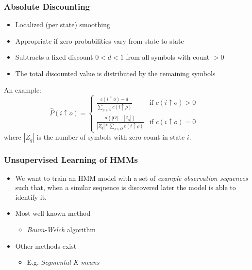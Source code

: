 \documentclass{beamer}
\begin{document}
\begin{frame} \frametitle{Absolute Discounting}
  
  \begin{itemize}
  \item Localized (per state) smoothing
  \item Appropriate if zero probabilities vary from state to state
  \item Subtracts a fixed discount $0 < d < 1$ from all symbols with count $>0$
  \item The total discounted value is distributed by the remaining symbols
  \end{itemize}

  An example:
  \begin{displaymath}
    \hat{P}(i \uparrow o) = 
    \left\{
    \begin{array}{ll}
      \frac{c(i \uparrow o)-d}
           {\sum_{\rho \in O}c(i \uparrow \rho)} &
                 \text{if $c(i \uparrow o) > 0$ }\\[2ex]
      \frac{d(|O|-|Z_q|)}{|Z_q|*\sum_{\rho \in O}c(i \uparrow \rho)} &
         \text{if $c(i \uparrow o) = 0$ }
    \end{array}
    \right.
  \end{displaymath}
  where $|Z_q|$ is the number of symbols with zero count in state $i$.

\end{frame}



\begin{frame} \frametitle{Unsupervised Learning of HMMs}

  \begin{itemize}
  \item We want to train an HMM model with a set of \emph{example observation
        sequences} such that, when a similar sequence is discovered later the
      model is able to identify it.
  \item Most well known method
      \begin{itemize}
      \item \emph{Baum-Welch} algorithm
      \end{itemize}
  \item Other methods exist
      \begin{itemize}
      \item E.g. \emph{Segmental K-means}
      \end{itemize}
  \end{itemize}
  
\end{frame}
\end{document}
